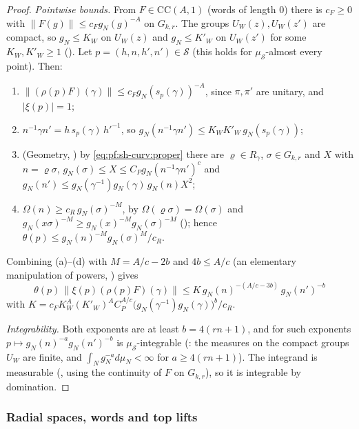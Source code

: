 \begin{proof}
\emph{Pointwise bounds.} From $F\in\mathrm{CC}(A,1)$ (words of length $0$) there is $c_F\ge0$ with $\|F(g)\|\le
c_Fg_N(g)^{-A}$ on $G_{k,r}$. The groups $U_W(z),U_W(z')$ are compact, so $g_N\le K_W$ on $U_W(z)$ and $g_N\le K'_W$ on
$U_W(z')$ for some $K_W,K'_W\ge1$ (). Let $p=(h,n,h',n')\in\mathcal S$
(this holds for $\mu_{\mathcal S}$-almost every point). Then:
\begin{enumerate}[label=(\alph*)]
\item $\|(\rho(p)F)(\gamma)\|\le c_Fg_N(s_p(\gamma))^{-A}$, since $\pi,\pi'$ are unitary, and $|\xi(p)|=1$;
\item $n^{-1}\gamma n'=h\,s_p(\gamma)\,h'^{-1}$, so $g_N(n^{-1}\gamma n')\le K_WK'_W\,g_N(s_p(\gamma))$;
\item (Geometry, ) by \eqref{eq:pf:sh-curv:proper} there are $\varrho\in
R_\gamma$, $\sigma\in G_{k,r}$ and $X$ with $n=\varrho\sigma$, $g_N(\sigma)\le X\le C_Pg_N(n^{-1}\gamma n')^c$ and
$g_N(n')\le g_N(\gamma^{-1})g_N(\gamma)\,g_N(n)X^2$;
\item $\Omega(n)\ge c_R\,g_N(\sigma)^{-M}$, by $\Omega(\varrho\sigma)=\Omega(\sigma)$ and
$g_N(x\sigma)^{-M}\ge g_N(x)^{-M}g_N(\sigma)^{-M}$ (); hence
$\theta(p)\le g_N(n)^{-M}g_N(\sigma)^M/c_R$.
\end{enumerate}
Combining (a)--(d) with $M=A/c-2b$ and $4b\le A/c$ (an elementary manipulation of powers,
) gives
\[
\theta(p)\,\|\xi(p)(\rho(p)F)(\gamma)\|\le K\,g_N(n)^{-(A/c-3b)}\,g_N(n')^{-b}
\]
with $K=c_FK_W^A(K'_W)^AC_P^{A/c}\bigl(g_N(\gamma^{-1})g_N(\gamma)\bigr)^b/c_R$.

\emph{Integrability.} Both exponents are at least $b=4(rn+1)$, and for such exponents
$p\mapsto g_N(n)^{-a}g_N(n')^{-b}$ is $\mu_{\mathcal S}$-integrable
(: the measures on the compact groups $U_W$ are finite, and
$\int_Ng_N^{-a}d\mu_N<\infty$ for $a\ge4(rn+1)$). The integrand is measurable
(, using the continuity of $F$ on $G_{k,r}$), so it is
integrable by domination.
\end{proof}

\subsubsection{Radial spaces, words and top lifts}

